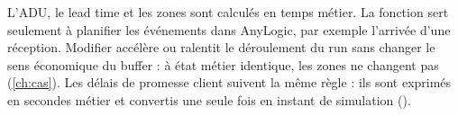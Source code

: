 L'ADU, le lead time et les zones sont calculés en temps métier. La fonction 
sert seulement à planifier les événements dans AnyLogic, par exemple l'arrivée d'une réception.
Modifier  accélère ou ralentit le déroulement du run sans changer le sens
économique du buffer : à état métier identique, les zones ne changent pas (\cref{ch:cas}).
Les délais de promesse client suivent la même règle : ils sont exprimés en secondes métier et
convertis une seule fois en instant de simulation ().
